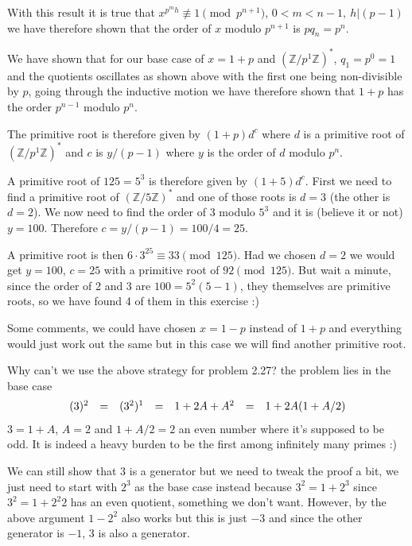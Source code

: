 \documentclass[aps,preprint,preprintnumbers,nofootinbib,showpacs,prd]{revtex4-1}
\newcommand{\nbea}{\begin{eqnarray*}}
\newcommand{\neea}{\end{eqnarray*}}
\begin{document}
With this result it is true that $x^{p^m h} \not\equiv 1 \pmod{p^{n+1}}$, $0 < m < n-1, ~h|(p-1)$ we have therefore shown that the order of $x$ modulo $p^{n+1}$ is $pq_n = p^n$.

We have shown that for our base case of $x=1+p$ and $(\mathbb{Z}/p^{1}\mathbb{Z})^*$, $q_1=p^0=1$ and the quotients oscillates as shown above with the first one being non-divisible by $p$, going through the inductive motion we have therefore shown that $1+p$ has the order $p^{n-1}$ modulo $p^n$.

The primitive root is therefore given by $(1+p)d^c$ where $d$ is a primitive root of $(\mathbb{Z}/p^{1}\mathbb{Z})^*$ and $c$ is $y/(p-1)$ where $y$ is the order of $d$ modulo $p^n$.

A primitive root of $125 = 5^3$ is therefore given by $(1+5)d^c$. First we need to find a primitive root of $(\mathbb{Z}/5\mathbb{Z})^*$ and one of those roots is $d=3$ (the other is $d=2$). We now need to find the order of 3 modulo $5^3$ and it is (believe it or not) $y=100$. Therefore $c = y/(p-1) = 100/4 = 25$.

A primitive root is then $6 \cdot 3^25 \equiv 33 \pmod{125}$. Had we chosen $d=2$ we would get $y = 100$, $c = 25$ with a primitive root of $92 \pmod{125}$. But wait a minute, since the order of 2 and 3 are $100 = 5^2(5-1)$, they themselves are primitive roots, so we have found 4 of them in this exercise :)

Some comments, we could have chosen $x=1-p$ instead of $1+p$ and everything would just work out the same but in this case we will find another primitive root.

Why can't we use the above strategy for problem 2.27? the problem lies in the base case
%
\nbea
\begin{array} {l c l c l c l}
(3)^2 & = & (3^{2})^1 & = & 1 + 2A + A^2 & = & 1 + 2A(1 + A/2)
\end{array}
\neea
%
$3 = 1 + A$, $A = 2$ and $1 + A/2 = 2$ an even number where it's supposed to be odd. It is indeed a heavy burden to be the first among infinitely many primes :) 

We can still show that 3 is a generator but we need to tweak the proof a bit, we just need to start with $2^3$ as the base case instead because $3^2 = 1 + 2^3$ since $3^2 = 1 + 2^2 2$ has an even quotient, something we don't want. However, by the above argument $1 - 2^2$ also works but this is just $-3$ and since the other generator is $-1$, $3$ is also a generator.
\end{document}
